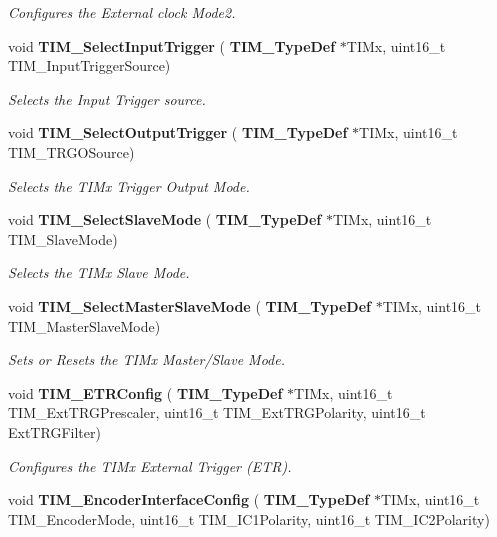 \begin{DoxyCompactItemize}
\begin{DoxyCompactList}\small\item\em Configures the External clock Mode2. \end{DoxyCompactList}\item 
void \textbf{ T\+I\+M\+\_\+\+Select\+Input\+Trigger} (\textbf{ T\+I\+M\+\_\+\+Type\+Def} $\ast$T\+I\+Mx, uint16\+\_\+t T\+I\+M\+\_\+\+Input\+Trigger\+Source)
\begin{DoxyCompactList}\small\item\em Selects the Input Trigger source. \end{DoxyCompactList}\item 
void \textbf{ T\+I\+M\+\_\+\+Select\+Output\+Trigger} (\textbf{ T\+I\+M\+\_\+\+Type\+Def} $\ast$T\+I\+Mx, uint16\+\_\+t T\+I\+M\+\_\+\+T\+R\+G\+O\+Source)
\begin{DoxyCompactList}\small\item\em Selects the T\+I\+Mx Trigger Output Mode. \end{DoxyCompactList}\item 
void \textbf{ T\+I\+M\+\_\+\+Select\+Slave\+Mode} (\textbf{ T\+I\+M\+\_\+\+Type\+Def} $\ast$T\+I\+Mx, uint16\+\_\+t T\+I\+M\+\_\+\+Slave\+Mode)
\begin{DoxyCompactList}\small\item\em Selects the T\+I\+Mx Slave Mode. \end{DoxyCompactList}\item 
void \textbf{ T\+I\+M\+\_\+\+Select\+Master\+Slave\+Mode} (\textbf{ T\+I\+M\+\_\+\+Type\+Def} $\ast$T\+I\+Mx, uint16\+\_\+t T\+I\+M\+\_\+\+Master\+Slave\+Mode)
\begin{DoxyCompactList}\small\item\em Sets or Resets the T\+I\+Mx Master/\+Slave Mode. \end{DoxyCompactList}\item 
void \textbf{ T\+I\+M\+\_\+\+E\+T\+R\+Config} (\textbf{ T\+I\+M\+\_\+\+Type\+Def} $\ast$T\+I\+Mx, uint16\+\_\+t T\+I\+M\+\_\+\+Ext\+T\+R\+G\+Prescaler, uint16\+\_\+t T\+I\+M\+\_\+\+Ext\+T\+R\+G\+Polarity, uint16\+\_\+t Ext\+T\+R\+G\+Filter)
\begin{DoxyCompactList}\small\item\em Configures the T\+I\+Mx External Trigger (E\+TR). \end{DoxyCompactList}\item 
void \textbf{ T\+I\+M\+\_\+\+Encoder\+Interface\+Config} (\textbf{ T\+I\+M\+\_\+\+Type\+Def} $\ast$T\+I\+Mx, uint16\+\_\+t T\+I\+M\+\_\+\+Encoder\+Mode, uint16\+\_\+t T\+I\+M\+\_\+\+I\+C1\+Polarity, uint16\+\_\+t T\+I\+M\+\_\+\+I\+C2\+Polarity)

\end{DoxyCompactItemize}
